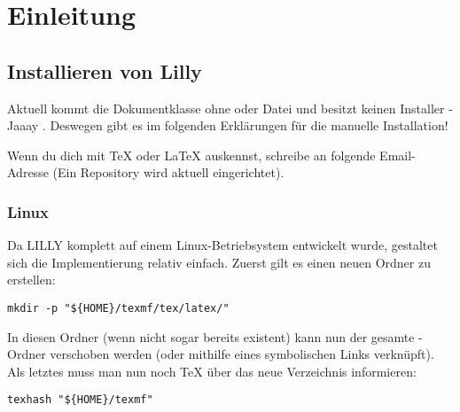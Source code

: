 \chapter{Einleitung}
\section{Installieren von Lilly}
Aktuell kommt die Dokumentklasse ohne  oder  Datei und besitzt keinen Installer - Jaaay \Smiley. Deswegen gibt es im folgenden Erklärungen für die manuelle Installation!
\begin{bemerkung}[Mithilfe]
    Wenn du dich mit \TeX{} oder \LaTeX{} auskennst, schreibe an folgende Email-Adresse \T{\AUTHORMAIL} (Ein Repository wird aktuell eingerichtet).
\end{bemerkung}

\subsection{Linux}
Da LILLY komplett auf einem Linux-Betriebsystem entwickelt wurde, gestaltet sich die Implementierung relativ einfach. 
Zuerst gilt es einen neuen Ordner zu erstellen:
\begin{lstlisting}[style=bash]
mkdir -p "${HOME}/texmf/tex/latex/"
\end{lstlisting}
In diesen Ordner (wenn nicht sogar bereits existent) kann nun der gesamte -Ordner verschoben werden (oder mithilfe eines symbolischen Links verknüpft). Als letztes muss man nun noch \TeX{} über das neue Verzeichnis informieren:
\begin{lstlisting}[style=bash]
texhash "${HOME}/texmf"
\end{lstlisting}

